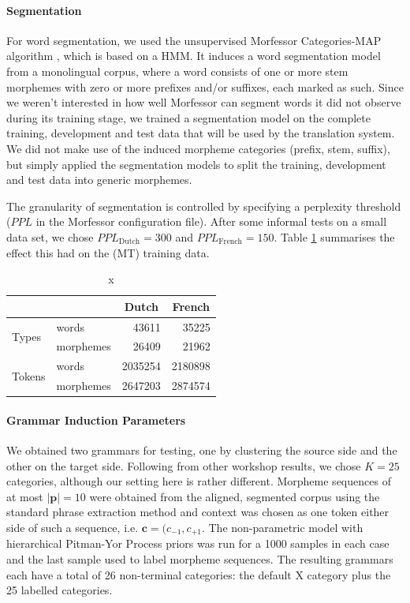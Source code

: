 \paragraph{Segmentation}
For word segmentation, we used the unsupervised Morfessor Categories-MAP algorithm \citep{Creutz2007}, which is based on a HMM.
It induces a word segmentation model from a monolingual corpus, where a word consists of one or more stem morphemes with zero or more prefixes and/or suffixes, each marked as such.
Since we weren't interested in how well Morfessor can segment words it did not observe during its training stage, we trained a segmentation model on the complete training, development and test data that will be used by the translation system.
We did not make use of the induced morpheme categories (prefix, stem, suffix), but simply applied the segmentation models to split the training, development and test data into generic morphemes.

The granularity of segmentation is controlled by specifying a perplexity threshold ($PPL$ in the Morfessor configuration file).
After some informal tests on a small data set, we chose $PPL_{\textrm{Dutch}}=300$ and $PPL_{\textrm{French}}=150$.
Table \ref{tbl:segmentation} summarises the effect this had on the (MT) training data.

\begin{table}[h]
  \centering
  \begin{tabular}{|l|l|r|r|}
    \multicolumn{2}{c}{} & \multicolumn{1}{c}{Dutch} & \multicolumn{1}{c}{French} \\ \hline
    \multirow{2}{*}{Types}  & words     & 43611 & 35225 \\ \cline{2-4}
                            & morphemes & 26409 & 21962 \\ \hline
    \multirow{2}{*}{Tokens} & words     & 2035254 & 2180898 \\ \cline{2-4} 
                            & morphemes & 2647203 & 2874574 \\ \hline
  \end{tabular}
  \caption{x}\label{tbl:segmentation}
\end{table}

\paragraph{Grammar Induction Parameters}
We obtained two grammars for testing, one by clustering the source side and the other on the target side.
Following from other workshop results, we chose $K=25$ categories, although our setting here is rather different.
Morpheme sequences of at most $|\mathbf{p}|=10$ were obtained from the aligned, segmented corpus using the standard phrase extraction method and context was chosen as one token either side of such a sequence, i.e. $\mathbf{c}=(c_{-1},c_{+1}$.
The non-parametric model with hierarchical Pitman-Yor Process priors was run for a 1000 samples in each case and the last sample used to label morpheme sequences.
The resulting grammars each have a total of 26 non-terminal categories: the default X category plus the 25 labelled categories.


